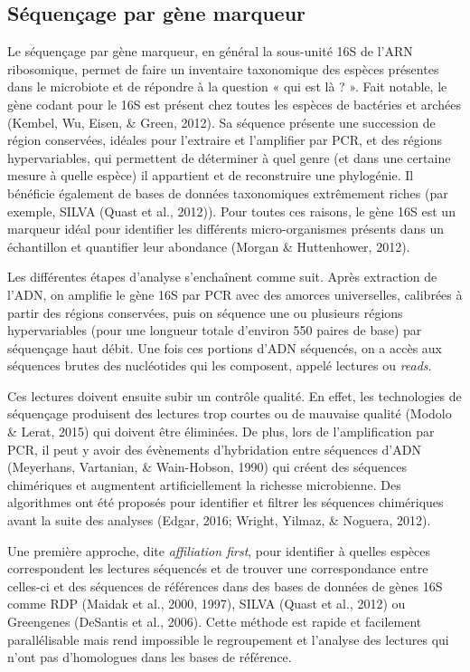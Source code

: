 \documentclass[12pt,a4paper]{reedthesis}
\theoremstyle{definition}
\theoremstyle{definition}
\theoremstyle{definition}
\theoremstyle{remark}
\begin{document}
\hypertarget{suxe9quenuxe7age-par-guxe8ne-marqueur}{%
\subsection{Séquençage par gène marqueur}\label{suxe9quenuxe7age-par-guxe8ne-marqueur}}

Le séquençage par gène marqueur, en général la sous-unité 16S de l'ARN ribosomique, permet de faire un inventaire taxonomique des espèces présentes dans le microbiote et de répondre à la question « qui est là ? ». Fait notable, le gène codant pour le 16S est présent chez toutes les espèces de bactéries et archées (Kembel, Wu, Eisen, \& Green, 2012). Sa séquence présente une succession de région conservées, idéales pour l'extraire et l'amplifier par PCR, et des régions hypervariables, qui permettent de déterminer à quel genre (et dans une certaine mesure à quelle espèce) il appartient et de reconstruire une phylogénie. Il bénéficie également de bases de données taxonomiques extrêmement riches (par exemple, SILVA (Quast et al., 2012)). Pour toutes ces raisons, le gène 16S est un marqueur idéal pour identifier les différents micro-organismes présents dans un échantillon et quantifier leur abondance (Morgan \& Huttenhower, 2012).

Les différentes étapes d'analyse s'enchaînent comme suit. Après extraction de l'ADN, on amplifie le gène 16S par PCR avec des amorces universelles, calibrées à partir des régions conservées, puis on séquence une ou plusieurs régions hypervariables (pour une longueur totale d'environ 550 paires de base) par séquençage haut débit. Une fois ces portions d'ADN séquencés, on a accès aux séquences brutes des nucléotides qui les composent, appelé lectures ou \emph{reads}.

Ces lectures doivent ensuite subir un contrôle qualité. En effet, les technologies de séquençage produisent des lectures trop courtes ou de mauvaise qualité (Modolo \& Lerat, 2015) qui doivent être éliminées. De plus, lors de l'amplification par PCR, il peut y avoir des évènements d'hybridation entre séquences d'ADN (Meyerhans, Vartanian, \& Wain-Hobson, 1990) qui créent des séquences chimériques et augmentent artificiellement la richesse microbienne. Des algorithmes ont été proposés pour identifier et filtrer les séquences chimériques avant la suite des analyses (Edgar, 2016; Wright, Yilmaz, \& Noguera, 2012).

Une première approche, dite \emph{affiliation first}, pour identifier à quelles espèces correspondent les lectures séquencés et de trouver une correspondance entre celles-ci et des séquences de références dans des bases de données de gènes 16S comme RDP (Maidak et al., 2000, 1997), SILVA (Quast et al., 2012) ou Greengenes (DeSantis et al., 2006). Cette méthode est rapide et facilement parallélisable mais rend impossible le regroupement et l'analyse des lectures qui n'ont pas d'homologues dans les bases de référence.
\end{document}
